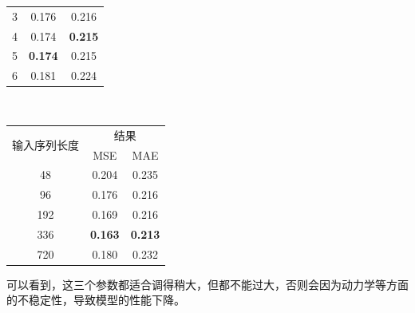 \documentclass[twoside,12pt]{article}
\begin{document}
\begin{table}[htbp]
\begin{tabular}{c|cc}
    3                            & 0.176                                        & 0.216          \\
    4                            & 0.174                                        & \textbf{0.215} \\
    5                            & \textbf{0.174}                               & 0.215          \\
    6                            & 0.181                                        & 0.224          \\
    \bottomrule
  \end{tabular}
  \\
  \vspace{5pt}
  \centering
  \begin{tabular}{c|cc}
    \toprule
    \multirow{2}{*}{输入序列长度} & \multicolumn{2}{c}{结果}                  \\
    \cmidrule(lr){2-3}
                                  & MSE                      & MAE            \\
    \midrule
    48                            & 0.204                    & 0.235          \\
    96                            & 0.176                    & 0.216          \\
    192                           & 0.169                    & 0.216          \\
    336                           & \textbf{0.163}           & \textbf{0.213} \\
    720                           & 0.180                    & 0.232          \\
    \bottomrule
  \end{tabular}
\end{table}

可以看到，这三个参数都适合调得稍大，但都不能过大，否则会因为动力学等方面的不稳定性，导致模型的性能下降。
\end{document}
